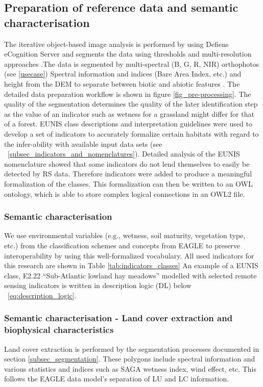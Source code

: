 \documentclass[authoryear, review,12pt,number]{elsarticle}
\begin{document}
\subsection{Preparation of reference data and semantic characterisation}
The iterative object-based image analysis is performed by \cite{Tintrup2015} 
using Defiens eCognition Server and segments the data using thresholds and 
multi-resolution approaches \citep{baatz2001ecognition}.The data is segmented 
by multi-spectral (B, G, R, NIR) orthophotos (see \ref{usecase}) 
Spectral information and indices (Bare Area Index, etc.) and 
height from the DEM to separate between biotic and abiotic features 
\citep{Tintrup2015}. The detailed %
data preparation workflow is 
shown in figure \ref{fig_pre-processing}. The quality of the segmentation
determines the quality of the later identification step as the value of an
indicator such as wetness for a grassland might differ for that of a forest.
EUNIS class descriptions and interpretation guidelines \citep{EUNISManual} were
used to develop a set of indicators to accurately formalize certain habitats
with regard to the infer-ability with available input data sets (see
~\ref{subsec_indicators_and_nomenclatures}). Detailed analysis of the EUNIS
nomenclature showed that some indicators do not lend themselves to easily be
detected by RS data. Therefore indicators were added to produce a meaningful
formalization of the classes.  This formalization can then be written to an OWL
ontology, which is able to store complex logical connections in an OWL2 file.


\subsubsection{Semantic characterisation} 
We use environmental variables (e.g., wetness, soil maturity, vegetation type,
etc.) from the classification schemes and concepts from EAGLE to preserve
interoperability by using this well-formalized vocabulary. All used indicators
for this research are shown in Table \ref{tab:indicators_classes} An example of
a EUNIS class, E2.22 ``Sub-Atlantic lowland hay meadows'' modelled with selected
remote sensing indicators is written in description logic (DL) below
~\ref{eq:description_logic}.
\subsubsection{Semantic characterisation - Land cover extraction and biophysical
characteristics}
Land cover extraction is performed by the segmentation processes documented in
section \ref{subsec_segmentation}.  
These polygons include spectral information and
various statistics and indices such as SAGA wetness index, wind effect, etc.
This follows the EAGLE data model's separation of LU and LC information.
\end{document}
